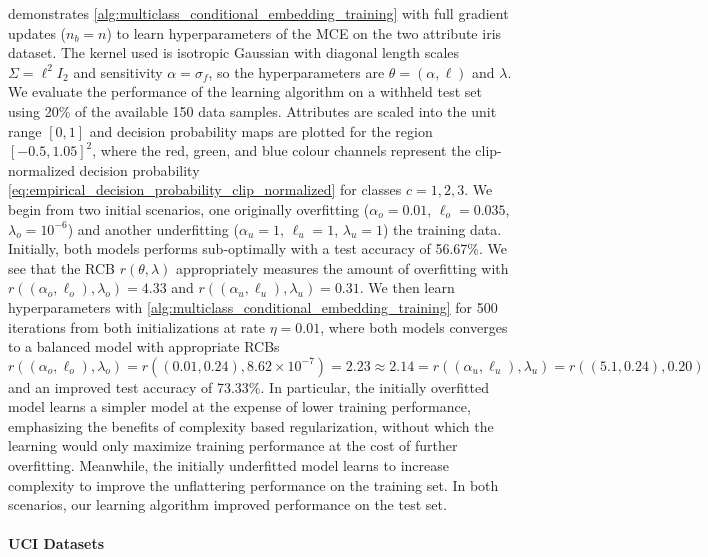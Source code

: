 \documentclass[twoside]{article}
\begin{document}
		 demonstrates \cref{alg:multiclass_conditional_embedding_training} with full gradient updates ($n_{b} = n$) to learn hyperparameters of the \gls{MCE} on the two attribute iris dataset. The kernel used is isotropic Gaussian with diagonal length scales $\Sigma = \ell^{2} I_{2}$ and sensitivity $\alpha = \sigma_{f}$, so the hyperparameters are $\theta = (\alpha, \ell)$ and $\lambda$. We evaluate the performance of the learning algorithm on a withheld test set using 20\% of the available 150 data samples. Attributes are scaled into the unit range $[0, 1]$ and decision probability maps are plotted for the region $[-0.5, 1.05]^{2}$, where the red, green, and blue colour channels represent the clip-normalized decision probability \eqref{eq:empirical_decision_probability_clip_normalized} for classes $c = 1, 2, 3$. We begin from two initial scenarios, one originally overfitting ($\alpha_{o} = 0.01$, $\ell_{o} = 0.035$, $\lambda_{o} = 10^{-6}$) and another underfitting ($\alpha_{u} = 1$, $\ell_{u} = 1$, $\lambda_{u} = 1$) the training data. Initially, both models performs sub-optimally with a test accuracy of 56.67\%. We see that the \gls{RCB} $r(\theta, \lambda)$ appropriately measures the amount of overfitting with $r((\alpha_{o}, \ell_{o}), \lambda_{o}) = 4.33$ and $r((\alpha_{u}, \ell_{u}), \lambda_{u}) = 0.31$. We then learn hyperparameters with \cref{alg:multiclass_conditional_embedding_training} for 500 iterations from both initializations at rate $\eta = 0.01$, where both models converges to a balanced model with appropriate \glspl{RCB} $r((\alpha_{o}, \ell_{o}), \lambda_{o}) = r((0.01, 0.24), 8.62 \times 10^{-7}) = 2.23 \approx 2.14 = r((\alpha_{u}, \ell_{u}), \lambda_{u}) = r((5.1, 0.24), 0.20)$ and an improved test accuracy of 73.33\%. In particular, the initially overfitted model learns a simpler model at the expense of lower training performance, emphasizing the benefits of complexity based regularization, without which the learning would only maximize training performance at the cost of further overfitting. Meanwhile, the initially underfitted model learns to increase complexity to improve the unflattering performance on the training set. In both scenarios, our learning algorithm improved performance on the test set.
	
	\paragraph{UCI Datasets}
	
\end{document}

